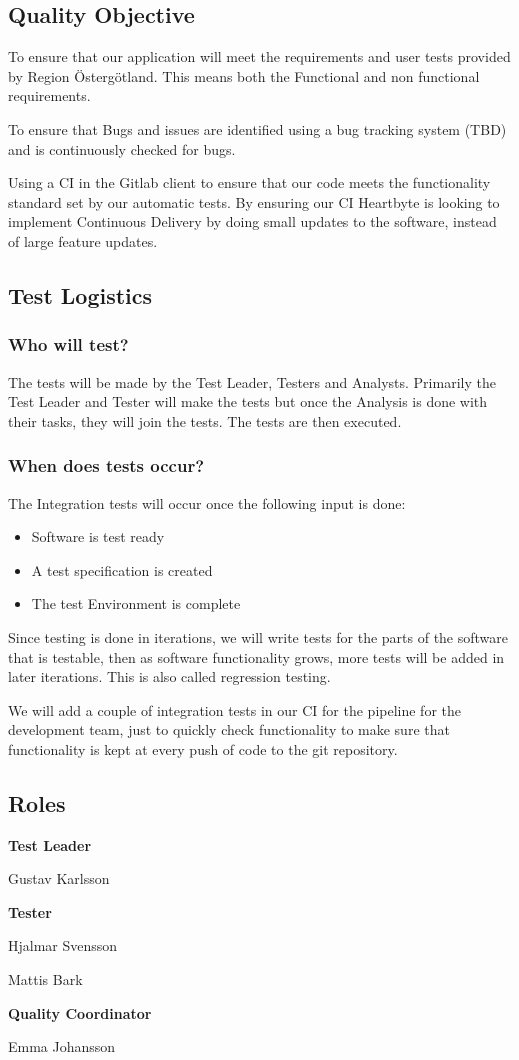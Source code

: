 \subsection{Quality Objective}
To ensure that our application will meet the requirements and user tests provided by Region Östergötland. This means both the Functional and non functional requirements. 

To ensure that Bugs and issues are identified using a bug tracking system (TBD) and is continuously checked for bugs.

Using a CI in the Gitlab client to ensure that our code meets the functionality standard set by our automatic tests. By ensuring our CI Heartbyte is looking to implement Continuous Delivery by doing small updates to the software, instead of large feature updates. 
\subsection{Test Logistics}
\subsubsection{Who will test?}
The tests will be made by the Test Leader, Testers and Analysts. Primarily the Test Leader and Tester will make the tests but once the Analysis is done with their tasks, they will join the tests. The tests are then executed.
\subsubsection{When does tests occur?}
The Integration tests will occur once the following input is done:
\begin{itemize}
    \item Software is test ready
    \item A test specification is created
    \item The test Environment is complete
\end{itemize}
Since testing is done in iterations, we will write tests for the parts of the software that is testable, then as software functionality grows, more tests will be added in later iterations. This is also called regression testing.

We will add a couple of integration tests in our CI for the pipeline for the development team, just to quickly check functionality to make sure that functionality is kept at every push of code to the git repository.
\subsection{Roles}
\begin{flushleft}
   \textbf{Test Leader}
    
    
    Gustav Karlsson
  
   \textbf{Tester}
   
    Hjalmar Svensson
    
    Mattis Bark
   
   
   \textbf{Quality Coordinator}
   
    Emma Johansson
     

\end{flushleft}

